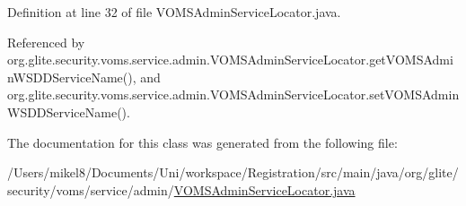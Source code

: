 Definition at line 32 of file VOMSAdminServiceLocator.java.



Referenced by org.glite.security.voms.service.admin.VOMSAdminServiceLocator.getVOMSAdminWSDDServiceName(), and org.glite.security.voms.service.admin.VOMSAdminServiceLocator.setVOMSAdminWSDDServiceName().



The documentation for this class was generated from the following file:\begin{DoxyCompactItemize}
\item 
/Users/mikel8/Documents/Uni/workspace/Registration/src/main/java/org/glite/security/voms/service/admin/\hyperlink{VOMSAdminServiceLocator_8java}{VOMSAdminServiceLocator.java}\end{DoxyCompactItemize}
